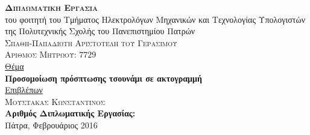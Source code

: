 \hfill
{}
\noindent\makebox[\textwidth]{\rule{\textwidth}{0.4pt}}

\large
\vspace{1.5cm}
\begin{center}
  {\huge \textsc{\textbf{Διπλωματικη Εργασια}}}\\[1cm]
  του φοιτητή του Τμήματος Ηλεκτρολόγων Μηχανικών και Τεχνολογίας Υπολογιστών\\
  της Πολυτεχνικής Σχολής του Πανεπιστημίου Πατρών\\[2cm]
  \textsc{\Large Σπαθη-Παπαδιωτη Αριστοτελη του Γερασιμου}\\[10pt]
  \textsc{Αριθμος Μητρωου: $7729$}\\[1.5cm]
  \uline{Θέμα}\\[0.3cm]
  \textbf{\Large Προσομοίωση πρόσπτωσης τσουνάμι σε ακτογραμμή}\\[1.2cm]
  \uline{Επιβλέπων}\\[0.3cm]
  \textsc{\Large Μουστακας Κωνσταντινος}\\[0.8cm]
  \textbf{Αριθμός Διπλωματικής Εργασίας:}\\
  \vfill Πάτρα, Φεβρουάριος 2016
\end{center}
\thispagestyle{empty}

\newpage\null\thispagestyle{empty}\newpage

